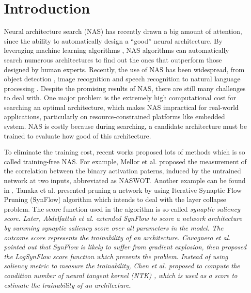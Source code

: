 \documentclass[sigconf]{acmart}
\begin{document}
\section{Introduction}
\label{sec:introduction}

    Neural architecture search (NAS) has recently drawn a big amount of 
    attention, since the ability to automatically design a ``good'' neural 
    architecture. By leveraging machine learning algorithms 
    \cite{https://doi.org/10.48550/arxiv.1611.01578}, NAS algorithms can 
    automatically search numerous architectures to find out the ones 
    that outperform those designed by human experts. Recently, the use of NAS has been widespread, 
    from object detection \cite{https://doi.org/10.48550/arxiv.2111.13336}, 
    image recognition \cite{https://doi.org/10.48550/arxiv.2006.04647} 
    and speech recognition \cite{https://doi.org/10.48550/arxiv.2011.05649} 
    to natural language processing \cite{jiang-etal-2019-improved}. 
    Despite the promising results of NAS, there are still many challenges 
    to deal with. One major problem is the extremely high computational 
    cost for searching an optimal architecture, which makes NAS 
    impractical for real-world applications, particularly on resource-constrained 
    platforms like embedded system. NAS is costly because 
    during searching, a candidate architecture must be trained to 
    evaluate how good of this architecture. %

    To eliminate the training cost, recent works proposed lots of methods 
    which is so called training-free NAS. 
    For example, Mellor et al. \cite{https://doi.org/10.48550/arxiv.2006.04647} 
    proposed the measurement of the correlation between the binary 
    activation paterns, induced by the untrained network at two inputs, 
    abbreviated as NASWOT. 
	Another example can be found in \cite{tanaka2020pruning}, Tanaka et al. 
    presented pruning a network by using Iterative Synaptic Flow Pruning 
    (SynFlow) algorithm which intends to deal with the layer collapse 
    problem. The score function used in the algorithm is so-called 
    \it{synaptic saliency} \rm{score}. Later, Abdelfattah et al. 
    \cite{abdelfattah2021zerocost} extended SynFlow to score a network 
    architecture by summing synaptic saliency score over all parameters 
    in the model. The outcome score represents the trainability of an 
    architecture. Cavagnero et al. \cite{Cavagnero_2023} pointed out that 
    SynFlow is likely to suffer from gradient explosion, then proposed 
    the LogSynFlow score function which prevents the problem. 
    Instead of using saliency metric to measure the trainability, Chen et al. 
    \cite{https://doi.org/10.48550/arxiv.2102.11535} proposed to compute 
    the condition number of neural tangent kernel (NTK) 
    \cite{https://doi.org/10.48550/arxiv.2109.00817}, which is used as 
    a score to estimate the trainability of an architecture. 
\end{document}
